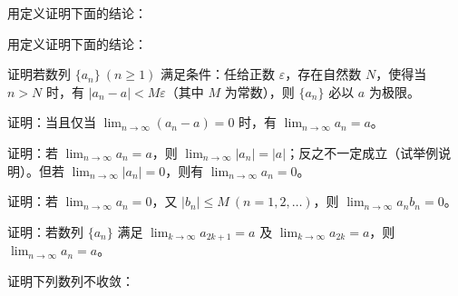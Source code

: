 \noindent\begin{minipage}{\textwidth}
用定义证明下面的结论：
\end{minipage}\par\vfill
\newpage
\noindent\begin{minipage}{\textwidth}
用定义证明下面的结论：
\end{minipage}\par\vfill
\noindent\begin{minipage}{\textwidth}
证明若数列 $\{a_n\}\ (n\ge1)$ 满足条件：任给正数 $\varepsilon$，存在自然数 $N$，使得当 $n>N$ 时，有 $|a_n-a|<M\varepsilon$（其中 $M$ 为常数），则 $\{a_n\}$ 必以 $a$ 为极限。
\end{minipage}\par\vfill
\noindent\begin{minipage}{\textwidth}
证明：当且仅当 $\displaystyle\lim_{n\to\infty}(a_n-a)=0$ 时，有 $\displaystyle\lim_{n\to\infty}a_n=a$。
\end{minipage}\par\vfill
\noindent\begin{minipage}{\textwidth}
证明：若 $\displaystyle\lim_{n\to\infty}a_n=a$，则 $\displaystyle\lim_{n\to\infty}|a_n|=|a|$；反之不一定成立（试举例说明）。但若 $\displaystyle\lim_{n\to\infty}|a_n|=0$，则有 $\displaystyle\lim_{n\to\infty}a_n=0$。
\end{minipage}\par\vfill
\newpage
\noindent\begin{minipage}{\textwidth}
证明：若 $\displaystyle\lim_{n\to\infty}a_n=0$，又 $|b_n|\le M\ (n=1,2,\ldots)$，则 $\displaystyle\lim_{n\to\infty}a_nb_n=0$。
\end{minipage}\par\vfill
\noindent\begin{minipage}{\textwidth}
证明：若数列 $\{a_n\}$ 满足 $\displaystyle\lim_{k\to\infty}a_{2k+1}=a$ 及 $\displaystyle\lim_{k\to\infty}a_{2k}=a$，则 $\displaystyle\lim_{n\to\infty}a_n=a$。
\end{minipage}\par\vfill
\noindent\begin{minipage}{\textwidth}
证明下列数列不收敛：
\end{minipage}\par\vfill

